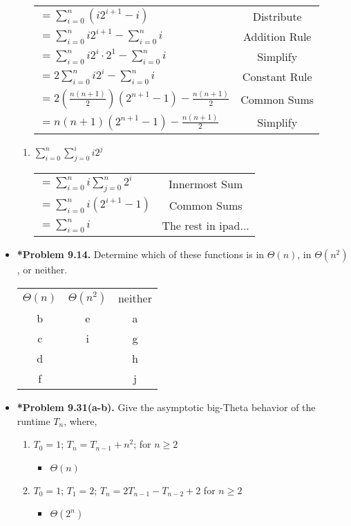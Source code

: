 \documentclass[11pt]{article}
\begin{document}
\begin{itemize}
\begin{enumerate}[label=(j)]
\begin{tabular}{l c}
      $= \displaystyle \sum_{i=0}^n (i2^{i+1} - i)$ & Distribute \\[0.25in]
      $= \displaystyle \sum_{i=0}^n i2^{i+1} - \displaystyle \sum_{i=0}^n i$ & Addition Rule \\[0.25in]
      $= \displaystyle \sum_{i=0}^n i2^i \cdot 2^1 - \displaystyle \sum_{i=0}^n i$ & Simplify \\[0.25in]
      $= 2 \displaystyle \sum_{i=0}^n i2^i - \displaystyle \sum_{i=0}^n i$ & Constant Rule \\[0.25in]
      $= 2(\frac{n(n+1)}{2})(2^{n+1} - 1) - \frac{n(n+1)}{2}$ & Common Sums \\[0.25in]
      $= n(n+1)(2^{n+1}-1) - \frac{n(n+1)}{2}$ & Simplify \\[0.25in]
    \end{tabular}
  \end{enumerate}
  \begin{enumerate}[label=(k)]
    \item $\displaystyle \sum_{i=0}^n\sum_{j=0}^i i2^j$\\[0.25in]
    \begin{tabular}{l c}
      $= \displaystyle \sum_{i=0}^n i \displaystyle \sum_{j=0}^n 2^i$ & Innermost Sum\\[0.25in]
      $= \displaystyle \sum_{i=0}^n i(2^{i+1}-1)$ & Common Sums\\[0.25in]
      $= \displaystyle \sum_{i=0}^n i$ & The rest in ipad...
    \end{tabular}
  \end{enumerate}
  \item \textbf{*Problem 9.14.} Determine which of these functions is in $\Theta(n)$, in $\Theta(n^2)$, or neither.\\
  \begin{tabular}{c c c}
    $\Theta(n)$ & $\Theta(n^2)$ & neither \\
    b & e & a\\
    c & i & g\\
    d &   & h\\
    f &   & j\\
  \end{tabular}
  \item \textbf{*Problem 9.31(a-b).} Give the asymptotic big-Theta behavior of the runtime $T_n$, where,
  \begin{enumerate}[label=(\alph*)]
    \item $T_0 = 1$; $T_n = T_{n-1} + n^2$; for $n \geq 2$
    \begin{itemize}[label=]
      \item $\Theta(n)$
    \end{itemize}
    \item $T_0 = 1$; $T_1 = 2$; $T_n = 2T_{n-1} - T_{n-2} + 2$ for $n \geq 2$
    \begin{itemize}[label=]
      \item $\Theta(2^n)$
    \end{itemize}
  \end{enumerate}

\end{itemize}
\end{document}
